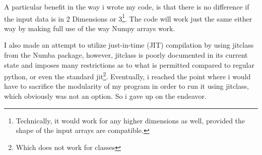 \documentclass[10pt,showpacs,preprintnumbers,amsmath,amssymb,nofootinbib,aps,prl,twocolumn,groupedaddress,superscriptaddress,showkeys]{revtex4-1}
\begin{document}
    A particular benefit in the way i wrote my code, is that there is no difference if the input data is in 2 Dimensions or 3\footnote{Technically, it would work for any higher dimensions as well, provided the shape of the input arrays are compatible.}. The code will work just the same either way by making full use of the way Numpy arrays work.

    I also made an attempt to utilize just-in-time (JIT) compilation by using jitclass from the Numba package, however, jitclass is poorly documented in its current state and imposes many restrictions as to what is permitted compared to regular python, or even the standard jit\footnote{Which does not work for classes}. Eventually, i reached the point where i would have to sacrifice the modularity of my program in order to run it using jitclass, which obviously was not an option. So i gave up on the endeavor.
\end{document}
